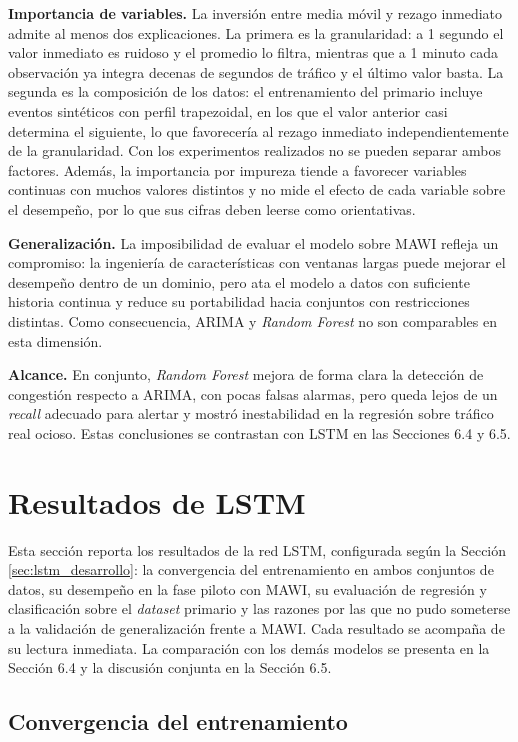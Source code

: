\documentclass[12pt]{report}
\begin{document}
\textbf{Importancia de variables.} La inversión entre media móvil y rezago inmediato admite al menos dos explicaciones. La primera es la granularidad: a 1 segundo el valor inmediato es ruidoso y el promedio lo filtra, mientras que a 1 minuto cada observación ya integra decenas de segundos de tráfico y el último valor basta. La segunda es la composición de los datos: el entrenamiento del primario incluye eventos sintéticos con perfil trapezoidal, en los que el valor anterior casi determina el siguiente, lo que favorecería al rezago inmediato independientemente de la granularidad. Con los experimentos realizados no se pueden separar ambos factores. Además, la importancia por impureza tiende a favorecer variables continuas con muchos valores distintos y no mide el efecto de cada variable sobre el desempeño, por lo que sus cifras deben leerse como orientativas.

\textbf{Generalización.} La imposibilidad de evaluar el modelo sobre MAWI refleja un compromiso: la ingeniería de características con ventanas largas puede mejorar el desempeño dentro de un dominio, pero ata el modelo a datos con suficiente historia continua y reduce su portabilidad hacia conjuntos con restricciones distintas. Como consecuencia, ARIMA y \textit{Random Forest} no son comparables en esta dimensión.

\textbf{Alcance.} En conjunto, \textit{Random Forest} mejora de forma clara la detección de congestión respecto a ARIMA, con pocas falsas alarmas, pero queda lejos de un \textit{recall} adecuado para alertar y mostró inestabilidad en la regresión sobre tráfico real ocioso. Estas conclusiones se contrastan con LSTM en las Secciones 6.4 y 6.5.

\section{Resultados de LSTM}
\label{sec:resultados_lstm}

Esta sección reporta los resultados de la red LSTM, configurada según la Sección \ref{sec:lstm_desarrollo}: la convergencia del entrenamiento en ambos conjuntos de datos, su desempeño en la fase piloto con MAWI, su evaluación de regresión y clasificación sobre el \textit{dataset} primario y las razones por las que no pudo someterse a la validación de generalización frente a MAWI. Cada resultado se acompaña de su lectura inmediata. La comparación con los demás modelos se presenta en la Sección 6.4 y la discusión conjunta en la Sección 6.5.

\subsection*{Convergencia del entrenamiento}
\end{document}
